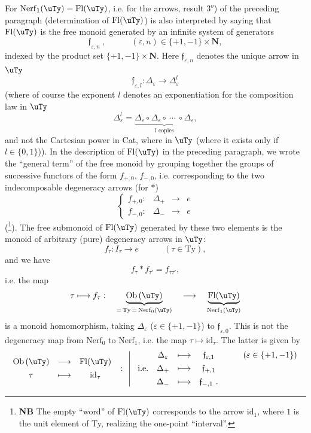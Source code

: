 For $\mathrm{Nerf}_1(\uTy) = \mathrm{Fl}(\uTy)$, i.e. for the arrows, result $3^o$) of the preceding paragraph (determination of $\mathrm{Fl}(\uTy)$) is also interpreted by saying that $\mathrm{Fl}(\uTy)$ is the free monoid generated by an infinite system of generators
\[
\mathfrak{f}_{\varepsilon,n}\ , \qquad\quad (\varepsilon,n)\in\{+1,-1\}\times\mathbf{N},
\]
indexed by the product set $\{+1,-1\}\times\mathbf{N}$. Here $\mathfrak{f}_{\varepsilon,n}$ denotes the unique arrow in $\uTy$
\[
\mathfrak{f}_{\varepsilon,l} : \Delta_\varepsilon \longrightarrow \Delta^l_\varepsilon
\]
(where of course the exponent $l$ denotes an exponentiation for the composition law in $\uTy$
\[
\Delta^l_\varepsilon = \underbrace{\Delta_\varepsilon\circ\Delta_\varepsilon\circ\ \cdots\ \circ\Delta_\varepsilon}_{l\text{ copies}},
\]
and not the Cartesian power in Cat, where in $\uTy$ (where it exists only if $l\in\{0,1\}$)). %
In the description of $\mathrm{Fl}(\uTy)$ in the preceding paragraph, we wrote the ``general term'' of the free monoid by grouping together the groups of successive functors of the form $f_{+,0}$, $f_{-,0}$, i.e. corresponding to the two indecomposable degeneracy arrows (for $*$) %
\[
\left\{
\begin{array}{lccc}
f_{+,0} : & \Delta_+ & \longrightarrow & e\\[4pt]
f_{-,0} : & \Delta_- & \longrightarrow & e
\end{array}
\right.
\]
(\footnote[15]{\textbf{NB} The empty ``word'' of $\mathrm{Fl}(\uTy)$ corresponds to the arrow $\mathrm{id}_1$, where $1$ is the unit element of Ty, realizing the one-point ``interval''.}). The free submonoid of $\mathrm{Fl}(\uTy)$ generated by these two elements is the monoid of arbitrary (pure) degeneracy arrows
in $\uTy$:
\[
f_\tau : I_\tau \longrightarrow e \qquad\quad (\tau\in\mathrm{Ty}),
\]
and we have
\[
f_\tau * f_{\tau'} = f_{\tau\tau'},
\]
i.e. the map
\[
\tau \longmapsto f_\tau :\quad \underbrace{\mathrm{Ob}\,(\uTy)}_{=\,\mathrm{Ty}\,=\,\mathrm{Nerf}_0(\uTy)} \quad\longrightarrow\quad \underbrace{\mathrm{Fl}(\uTy)}_{\mathrm{Nerf}_1(\uTy)}
\]
is a monoid homomorphism, taking $\Delta_\varepsilon$ ($\varepsilon\in\{+1,-1\}$) to $\mathfrak{f}_{\varepsilon,0}$. This is not the degeneracy map from $\mathrm{Nerf}_0$ to $\mathrm{Nerf}_1$, i.e. the map $\tau\longmapsto\mathrm{id}_\tau$. The latter is given by %
\[
\begin{array}{ccc}
\mathrm{Ob}\,(\uTy) & \longrightarrow & \mathrm{Fl}(\uTy)\\[4pt]
\tau & \longmapsto & \mathrm{id}_\tau
\end{array}
\ :\
\left|\
\begin{array}{rcccl}
 & \Delta_\varepsilon & \longmapsto & \mathfrak{f}_{\varepsilon,1} & \qquad(\varepsilon\in\{+1,-1\})\\[4pt]
\text{i.e.} & \Delta_+ & \longmapsto & \mathfrak{f}_{+,1} & \\[4pt]
 & \Delta_- & \longmapsto & \mathfrak{f}_{-,1}\ . &
\end{array}
\right.
\]
